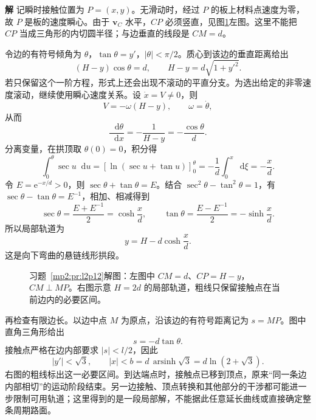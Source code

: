 \documentclass[11pt,openany,fontset=fandol]{ctexbook}
\theoremstyle{definition}\newtheorem{example}{例}[chapter]\newtheorem{exercise}{习题}[chapter]
\newcommand{\SolutionStart}{\par\medskip\ifdim\pagetotal>0pt\ifdim\dimexpr\pagegoal-\pagetotal\relax<3\baselineskip\newpage\fi\fi\noindent\textbf{解}\quad\ignorespaces}
\newenvironment{solution}{\SolutionStart}{\par\medskip}
\newcommand{\dd}{\mathop{}\!\mathrm d}\newcommand{\ee}{\mathrm e}\newcommand{\vct}[1]{\bm{#1}}
\begin{document}
\begin{solution}
记瞬时接触位置为 $P=(x,y)$。无滑动时，经过 $P$ 的板上材料点速度为零，故 $P$ 是板的速度瞬心。由于 $\vct v_C$ 水平，$CP$ 必须竖直，见图\ref{mp2:fig:l2p12-s}左图。这里不能把 $CP$ 当成三角形的内切圆半径；与边垂直的线段是 $CM=d$。

令边的有符号倾角为 $\theta$，$\tan\theta=y'$，$|\theta|<\pi/2$。质心到该边的垂直距离给出
\[
(H-y)\cos\theta=d,
\qquad H-y=d\sqrt{1+y'^2}.
\]
若只保留这个一阶方程，形式上还会出现不滚动的平直分支。为选出给定的非零速度滚动，继续使用瞬心速度关系。设 $\dot x=V\ne0$，则
\[
V=-\omega(H-y),\qquad \omega=\dot\theta,
\]
从而
\[
\frac{\dd\theta}{\dd x}=-\frac1{H-y}=-\frac{\cos\theta}{d}.
\]
分离变量，在拱顶取 $\theta(0)=0$，积分得
\[
\int_0^\theta\sec u\dd u
=\left[\ln(\sec u+\tan u)\right]_0^\theta
=-\frac1d\int_0^x\dd\xi=-\frac xd.
\]
令 $E=\ee^{-x/d}>0$，则 $\sec\theta+\tan\theta=E$。结合 $\sec^2\theta-\tan^2\theta=1$，有 $\sec\theta-\tan\theta=E^{-1}$，相加、相减得到
\[
\sec\theta=\frac{E+E^{-1}}2=\cosh\frac xd,\qquad
\tan\theta=\frac{E-E^{-1}}2=-\sinh\frac xd.
\]
所以局部轨道为
\[
y=H-d\cosh\frac xd.
\]
这是向下弯曲的悬链线形拱段。

\begin{figure}[H]\centering
{}
\caption{习题~\ref{mp2:pr:l2p12}解图：左图中 $CM=d$、$CP=H-y$，$CM\perp MP$。右图示意 $H=2d$ 的局部轨道，粗线只保留接触点在当前边内的必要区间。}\label{mp2:fig:l2p12-s}
\end{figure}

再检查有限边长。以边中点 $M$ 为原点，沿该边的有符号距离记为 $s=MP$。图中直角三角形给出
\[
s=-d\tan\theta.
\]
接触点严格在边内部要求 $|s|<l/2$，因此
\[
|y'|<\sqrt3,\qquad
|x|<b=d\,\operatorname{arsinh}\sqrt3=d\ln(2+\sqrt3).
\]
右图的粗线标出这一必要区间。到达端点时，接触点已移到顶点，原来“同一条边内部相切”的运动阶段结束。另一边接触、顶点转换和其他部分的干涉都可能进一步限制可用轨道；这里得到的是一段局部解，不能据此任意延长曲线或直接确定整条周期路面。


\end{solution}
\end{document}
